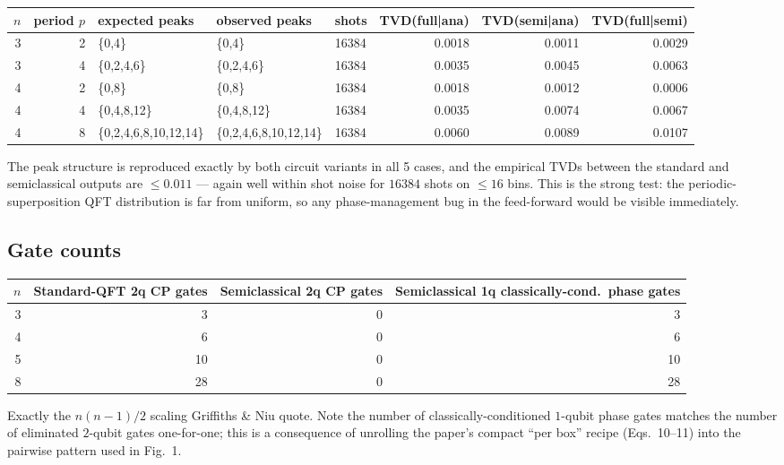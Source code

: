 \documentclass[11pt,letterpaper]{article}
\begin{document}
\begin{center}
\small
\begin{tabular}{@{}rrlllrrr@{}}
\toprule
$n$ & period $p$ & expected peaks & observed peaks & shots & TVD(full|ana) & TVD(semi|ana) & TVD(full|semi) \\
\midrule
3 & 2 & \{0,4\}                 & \{0,4\}                 & 16384 & 0.0018 & 0.0011 & 0.0029 \\
3 & 4 & \{0,2,4,6\}             & \{0,2,4,6\}             & 16384 & 0.0035 & 0.0045 & 0.0063 \\
4 & 2 & \{0,8\}                 & \{0,8\}                 & 16384 & 0.0018 & 0.0012 & 0.0006 \\
4 & 4 & \{0,4,8,12\}            & \{0,4,8,12\}            & 16384 & 0.0035 & 0.0074 & 0.0067 \\
4 & 8 & \{0,2,4,6,8,10,12,14\}  & \{0,2,4,6,8,10,12,14\}  & 16384 & 0.0060 & 0.0089 & 0.0107 \\
\bottomrule
\end{tabular}
\end{center}

The peak structure is reproduced exactly by both circuit variants in
all 5 cases, and the empirical TVDs between the standard and
semiclassical outputs are $\le 0.011$ --- again well within shot noise
for $16384$ shots on $\le 16$ bins. This is the strong test: the
periodic-superposition QFT distribution is far from uniform, so any
phase-management bug in the feed-forward would be visible immediately.

\subsection{Gate counts}

\begin{center}
\begin{tabular}{@{}rrrr@{}}
\toprule
$n$ & Standard-QFT 2q CP gates & Semiclassical 2q CP gates & Semiclassical 1q classically-cond.\ phase gates \\
\midrule
3 & 3  & 0 & 3 \\
4 & 6  & 0 & 6 \\
5 & 10 & 0 & 10 \\
8 & 28 & 0 & 28 \\
\bottomrule
\end{tabular}
\end{center}

Exactly the $n(n-1)/2$ scaling Griffiths \& Niu quote.  Note the
number of classically-conditioned $1$-qubit phase gates matches the
number of eliminated $2$-qubit gates one-for-one; this is a
consequence of unrolling the paper's compact ``per box'' recipe
(Eqs.~10--11) into the pairwise pattern used in Fig.~1.
\end{document}
